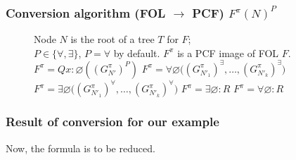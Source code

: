 \documentclass[aspectratio=169]{beamer}
\begin{document}
\begin{frame}
\frametitle{Conversion algorithm (FOL $\to$ PCF) $F^\pi(N)^P$}
\renewcommand{\algorithmicrequire}{\textbf{Input:}}
\renewcommand{\algorithmicensure}{\textbf{Output:}}
\begin{figure}[H]
  \footnotesize\centering
\begin{algorithmic}
  \REQUIRE Node $N$ is the root of a tree $T$ for $F$; \\
  $P \in \{\forall,\exists\}$, $P=\forall$ by default.
\ENSURE $F^{\pi}$ is a PCF image of FOL $F$.
\RETURN  $F^{\pi} = Qx\colon\varnothing ( (G_{N'}^{\pi})^{P} )$
\ENDIF
{}
  \RETURN  $F^{\pi} = \forall\varnothing \bigl( (G_{N'_1}^{\pi})^{\exists},\ldots,(G_{N'_k}^{\pi})^{\exists}\bigr)$
\ENDIF
{}
  \RETURN  $F^{\pi} = \exists\varnothing \bigl( (G_{N'_1}^{\pi})^{\forall},\ldots,(G_{N'_k}^{\pi})^{\forall}\bigr)$
\ENDIF
{}
  \RETURN  $F^{\pi} = \exists\varnothing\colon R$
\ENDIF
{}
  \RETURN  $F^{\pi} = \forall\varnothing\colon R$
\ENDIF
\end{algorithmic}
\end{figure}
\end{frame}

\begin{frame}
\frametitle{Result of conversion for our example}

Now, the formula is to be reduced.
\end{frame}
\end{document}
